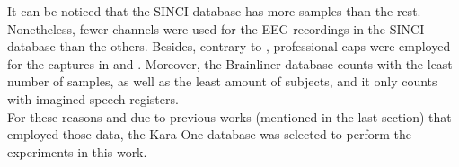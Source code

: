 It can be noticed that the SINCI database has more samples than the rest. Nonetheless, fewer channels were used for the EEG recordings in the SINCI database than the others. Besides, contrary to \cite{sinci}, professional caps were employed for the captures in \cite{karaone} and \cite{brainliner}. Moreover, the Brainliner database counts with the least number of samples, as well as the least amount of subjects, and it only counts with imagined speech registers.\\

For these reasons and due to previous works (mentioned in the last section) that employed those data, the Kara One database was selected to perform the experiments in this work. 


